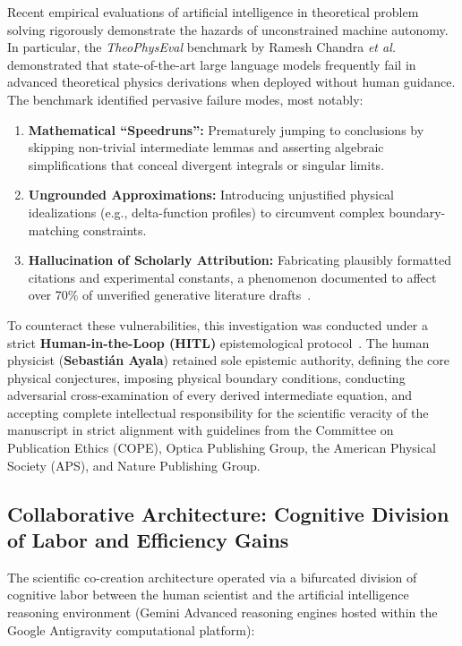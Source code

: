 \documentclass[11pt,a4paper]{article}
\begin{document}
Recent empirical evaluations of artificial intelligence in theoretical problem solving rigorously demonstrate the hazards of unconstrained machine autonomy. In particular, the \emph{TheoPhysEval} benchmark by Ramesh Chandra \emph{et al.}~\cite{Chandra2026TheoPhysEval} demonstrated that state-of-the-art large language models frequently fail in advanced theoretical physics derivations when deployed without human guidance. The benchmark identified pervasive failure modes, most notably:
\begin{enumerate}
    \item \textbf{Mathematical ``Speedruns'':} Prematurely jumping to conclusions by skipping non-trivial intermediate lemmas and asserting algebraic simplifications that conceal divergent integrals or singular limits.
    \item \textbf{Ungrounded Approximations:} Introducing unjustified physical idealizations (e.g., delta-function profiles) to circumvent complex boundary-matching constraints.
    \item \textbf{Hallucination of Scholarly Attribution:} Fabricating plausibly formatted citations and experimental constants, a phenomenon documented to affect over 70\% of unverified generative literature drafts~\cite{Kacena2024}.
\end{enumerate}

To counteract these vulnerabilities, this investigation was conducted under a strict \textbf{Human-in-the-Loop (HITL)} epistemological protocol~\cite{Haber2025,Jauhiainen2026}. The human physicist (\textbf{Sebastián Ayala}) retained sole epistemic authority, defining the core physical conjectures, imposing physical boundary conditions, conducting adversarial cross-examination of every derived intermediate equation, and accepting complete intellectual responsibility for the scientific veracity of the manuscript in strict alignment with guidelines from the Committee on Publication Ethics (COPE), Optica Publishing Group, the American Physical Society (APS), and Nature Publishing Group.

\subsection{Collaborative Architecture: Cognitive Division of Labor and Efficiency Gains}
\label{subsec:architecture}

The scientific co-creation architecture operated via a bifurcated division of cognitive labor between the human scientist and the artificial intelligence reasoning environment (Gemini Advanced reasoning engines hosted within the Google Antigravity computational platform):
\end{document}
